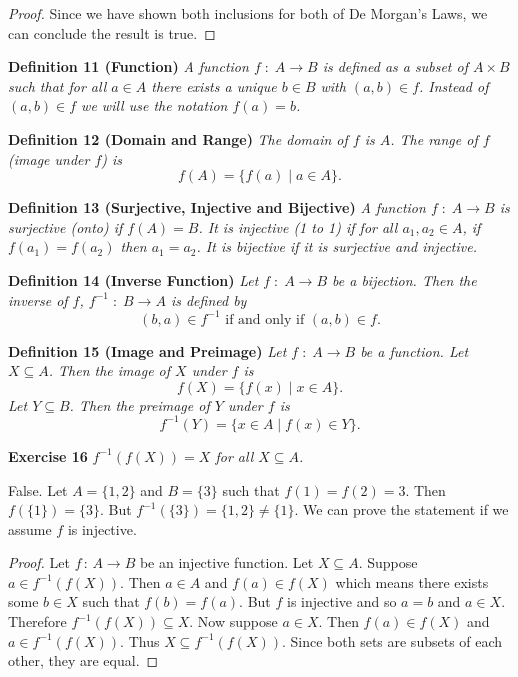 \documentclass{article}
\begin{document}
\begin{flushleft}
\begin{proof}
Since we have shown both inclusions for both of De Morgan's Laws, we can conclude the result is true.
\end{proof}

\textbf{Definition 11 (Function)}
\textsl{A function $f \; : \; A \rightarrow B$ is defined as a subset of $A \times B$ such that for all $a \in A$ there exists a unique $b \in B$ with $(a,b) \in f$. Instead of $(a,b) \in f$ we will use the notation $f(a) = b$.}\newline

\textbf{Definition 12 (Domain and Range)}
\textsl{The domain of $f$ is $A$. The range of $f$ (image under $f$) is
\[
f(A) = \{f(a) \mid a \in A\}.
\]}

\textbf{Definition 13 (Surjective, Injective and Bijective)}
\textsl{A function $f \; : \; A \rightarrow B$ is surjective (onto) if $f(A) = B$. It is injective (1 to 1) if for all $a_1,a_2 \in A$, if $f(a_1)=f(a_2)$ then $a_1=a_2$. It is bijective if it is surjective and injective.}\newline

\textbf{Definition 14 (Inverse Function)}
\textsl{Let $f \; : \; A \rightarrow B$ be a bijection. Then the inverse of $f$, $f^{-1} \; : \; B \rightarrow A$ is defined by
\[
(b,a) \in f^{-1} \text{ if and only if } (a,b) \in f.
\]}

\textbf{Definition 15 (Image and Preimage)}
\textsl{Let $f \; : \; A \rightarrow B$ be a function. Let $X \subseteq A$. Then the image of $X$ under $f$ is
\[
f(X) = \{f(x) \mid x \in A\}.
\]
Let $Y \subseteq B$. Then the preimage of $Y$ under $f$ is
\[
f^{-1}(Y) = \{x \in A \mid f(x) \in Y\}.
\]}

\textbf{Exercise 16}
\textsl{$f^{-1}(f(X)) = X$ for all $X \subseteq A$.}\newline

False. Let $A = \{1,2\}$ and $B = \{3\}$ such that $f(1)=f(2)=3$. Then $f(\{1\}) = \{3\}$. But $f^{-1}(\{3\})=\{1,2\} \neq \{1\}$. We can prove the statement if we assume $f$ is injective.

\begin{proof}
Let $f\, : \, A \rightarrow B$ be an injective function. Let $X \subseteq A$. Suppose $a \in f^{-1}(f(X))$. Then $a \in A$ and $f(a) \in f(X)$ which means there exists some $b \in X$ such that $f(b)=f(a)$. But $f$ is injective and so $a=b$ and $a \in X$. Therefore $f^{-1}(f(X)) \subseteq X$. Now suppose $a \in X$. Then $f(a) \in f(X)$ and $a \in f^{-1}(f(X))$. Thus $X \subseteq f^{-1}(f(X))$. Since both sets are subsets of each other, they are equal.
\end{proof}


\end{flushleft}
\end{document}
